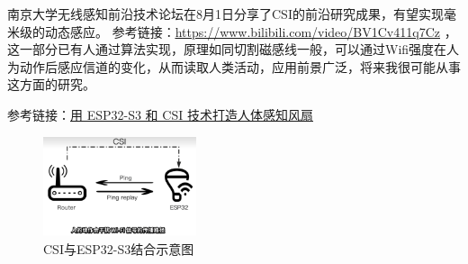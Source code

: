 南京大学无线感知前沿技术论坛在8月1日分享了CSI的前沿研究成果，有望实现毫米级的动态感应。
参考链接：\href{https://www.bilibili.com/video/BV1Cv411q7Cz}{\underline{https://www.bilibili.com/video/BV1Cv411q7Cz}}
，这一部分已有人通过算法实现，原理如同切割磁感线一般，可以通过Wifi强度在人为动作后感应信道的变化，从而读取人类活动，应用前景广泛，将来我很可能从事这方面的研究。

参考链接：\href{https://www.bilibili.com/video/BV1cGHreYEzB}{\underline{用 ESP32-S3 和 CSI 技术打造人体感知风扇}}

\begin{figure} [H]
    \centering
    \includegraphics[width=0.4\textwidth]{img/CSI.png}
    \caption{CSI与ESP32-S3结合示意图}
    \label{fig:CSI}
\end{figure}